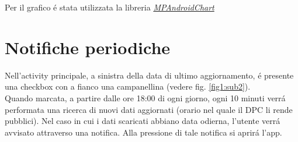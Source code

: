 \documentclass{article}
\begin{document}
    Per il grafico é stata utilizzata la libreria \href{https://github.com/PhilJay/MPAndroidChart}{\emph{MPAndroidChart}}

    \section{Notifiche periodiche}
    Nell'activity principale, a sinistra della data di ultimo aggiornamento, é presente una checkbox con a fianco una campanellina (vedere fig. \ref{fig1:sub2}).
    \\
    Quando marcata, a partire dalle ore 18:00 di ogni giorno, ogni 10 minuti verrá performata una ricerca di nuovi dati aggiornati (orario nel quale il DPC li rende pubblici).
    Nel caso in cui i dati scaricati abbiano data odierna, l'utente verrá avvisato attraverso una notifica. Alla pressione di tale notifica si aprirá l'app.
\end{document}
